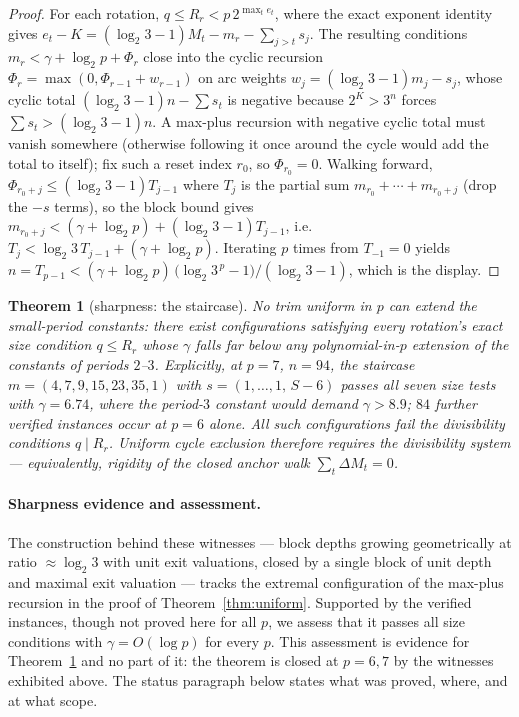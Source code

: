 \documentclass[11pt]{article}
\newtheorem{theorem}{Theorem}[section]
\theoremstyle{remark}
\newcommand{\LL}{\log_2 3}
\begin{document}
\begin{proof}
For each rotation, $q \le R_r < p\,2^{\max_t e_t}$, where the exact exponent identity gives $e_t - K = (\LL-1)M_t - m_r - \sum_{j>t}s_j$. The resulting conditions $m_r < \gamma + \log_2 p + \Phi_r$ close into the cyclic recursion $\Phi_{r} = \max(0, \Phi_{r-1} + w_{r-1})$ on arc weights $w_j = (\LL-1)m_j - s_j$, whose cyclic total $(\LL-1)n - \sum s_t$ is negative because $2^K > 3^n$ forces $\sum s_t > (\LL - 1)n$. A max-plus recursion with negative cyclic total must vanish somewhere (otherwise following it once around the cycle would add the total to itself); fix such a reset index $r_0$, so $\Phi_{r_0} = 0$. Walking forward, $\Phi_{r_0+j} \le (\LL-1)T_{j-1}$ where $T_j$ is the partial sum $m_{r_0} + \cdots + m_{r_0+j}$ (drop the $-s$ terms), so the block bound gives $m_{r_0+j} < (\gamma + \log_2 p) + (\LL-1)T_{j-1}$, i.e.\ $T_j < \LL\,T_{j-1} + (\gamma + \log_2 p)$. Iterating $p$ times from $T_{-1} = 0$ yields $n = T_{p-1} < (\gamma + \log_2 p)\,\bigl(\LL^{\,p} - 1\bigr)/(\LL - 1)$, which is the display.
\end{proof}

\begin{theorem}[sharpness: the staircase]\label{thm:staircase}
No trim uniform in $p$ can extend the small-period constants: there exist configurations satisfying every rotation's exact size condition $q \le R_r$ whose $\gamma$ falls far below any polynomial-in-$p$ extension of the constants of periods $2$--$3$. Explicitly, at $p=7$, $n=94$, the staircase $m = (4,7,9,15,23,35,1)$ with $s = (1,\dots,1,\,S-6)$ passes all seven size tests with $\gamma = 6.74$, where the period-$3$ constant would demand $\gamma > 8.9$; $84$ further verified instances occur at $p=6$ alone. All such configurations fail the divisibility conditions $q \mid R_r$. Uniform cycle exclusion therefore requires the divisibility system --- equivalently, rigidity of the closed anchor walk $\sum_t \Delta M_t = 0$.
\end{theorem}

\paragraph{Sharpness evidence and assessment.} The construction behind these witnesses --- block depths growing geometrically at ratio $\approx\LL$ with unit exit valuations, closed by a single block of unit depth and maximal exit valuation --- tracks the extremal configuration of the max-plus recursion in the proof of Theorem~\ref{thm:uniform}. Supported by the verified instances, though not proved here for all $p$, we assess that it passes all size conditions with $\gamma = O(\log p)$ for every $p$. This assessment is evidence for Theorem~\ref{thm:staircase} and no part of it: the theorem is closed at $p = 6, 7$ by the witnesses exhibited above. The status paragraph below states what was proved, where, and at what scope.
\end{document}
